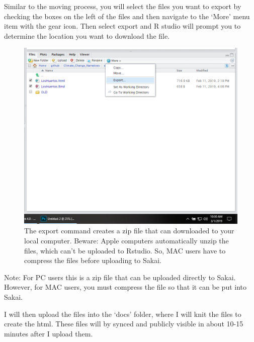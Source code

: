 \documentclass{article}\usepackage[]{graphicx}\usepackage[]{color}
\begin{document}
Similar to the moving process, you will select the files you want to export by checking the boxes on the left of the files and then navigate to the `More' menu item with the gear icon. Then select export and R studio will prompt you to determine the location you want to download the file.

\begin{figure}[h]
\includegraphics[width=\textwidth]{ExportFiles}
\caption{The export command creates a zip file that can downloaded to your local computer. Beware: Apple computers automatically unzip the files, which can't be uploaded to Rstudio. So, MAC users have to compress the files before uploading to Sakai.}
\end{figure}


Note: For PC users this is a zip file that can be uploaded directly to Sakai. However, for MAC users, you must compress the file so that it can be put into Sakai. 

I will then upload the files into the `docs' folder, where I will knit the files to create the html. These files will by synced and publicly visible in about 10-15 minutes after I upload them. 
\end{document}
